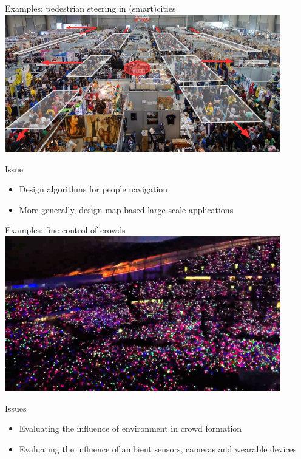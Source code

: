 \documentclass[presentation, 8pt]{beamer}\mode<presentation>{\usetheme{AMSBolognaFC}}
\begin{document}
\begin{frame}{Examples: pedestrian steering in (smart)cities}
\includegraphics[width=0.9\textwidth]{img/pedastrian.png}
\begin{alertblock}{Issue}
	\begin{itemize}
		\item Design  algorithms for people navigation
		\item More generally, design map-based large-scale applications
	\end{itemize}
\end{alertblock}
\end{frame}
\begin{frame}{Examples: fine control of crowds}
\centering
\includegraphics[width=0.9\textwidth]{img/coldplay}
\begin{alertblock}{Issues}
	\begin{itemize}
		\item Evaluating the influence of environment in crowd formation
		\item Evaluating the influence of ambient sensors, cameras and wearable
		devices
	\end{itemize}
\end{alertblock}
\end{frame}
\end{document}
